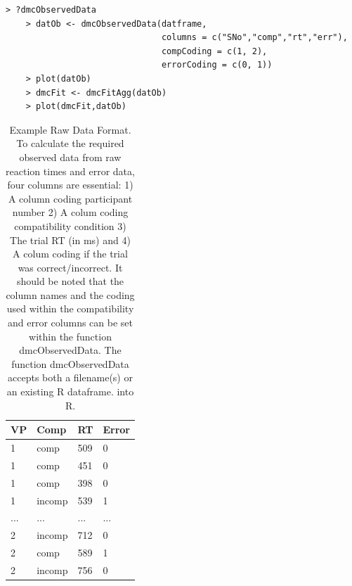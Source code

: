 \begin{minipage}{\linewidth}
    \begin{lstlisting}[style = R, title = {R Code Example 6}, captionpos = t]
    > ?dmcObservedData
    > datOb <- dmcObservedData(datframe, 
                               columns = c("SNo","comp","rt","err"), 
                               compCoding = c(1, 2), 
                               errorCoding = c(0, 1)) 
    > plot(datOb)
    > dmcFit <- dmcFitAgg(datOb)
    > plot(dmcFit,datOb)
    \end{lstlisting}
\end{minipage}

\begin{table}
    \centering
    \caption{
        Example Raw Data Format. To calculate the required observed data from
        raw reaction times and error data, four columns are essential: 1) A
        column coding participant number 2) A colum coding compatibility
        condition 3) The trial RT (in ms) and 4) A colum coding if the trial
        was correct/incorrect. It should be noted that the column names and the
        coding used within the compatibility and error columns can be set
        within the function dmcObservedData. The function dmcObservedData
        accepts both a filename(s) or an existing R dataframe.
        into R.
    }
    \begin{tabular}{llll}
        \hline
        VP&Comp&RT&Error\\ 
        \hline
        1&comp&509&0\\ 
        1&comp&451&0\\ 
        1&comp&398&0\\ 
        1&incomp&539&1\\ 
        ...&...&...&...\\ 
        2&incomp&712&0\\ 
        2&comp&589&1\\ 
        2&incomp&756&0\\ 
    \end{tabular}
    \label{tab:dmc_raw_data}
\end{table}

